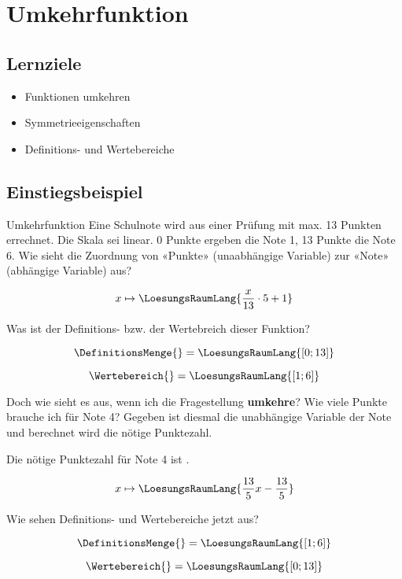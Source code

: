\section{Umkehrfunktion}

\subsection{Lernziele}

\begin{itemize}
\item Funktionen umkehren
\item Symmetrieeigenschaften
\item Definitions- und Wertebereiche
\end{itemize} 
\newpage

\subsection{Einstiegsbeispiel}
\begin{beispiel}{Umkehrfunktion}{}
  Eine Schulnote wird aus einer Prüfung mit max. 13 Punkten errechnet.
  Die Skala sei linear. 0 Punkte ergeben die Note 1, 13 Punkte die
  Note 6. Wie sieht die Zuordnung von «Punkte» (unaabhängige Variable)
  zur «Note» (abhängige Variable) aus?

  \leserluft
  
  $$x \mapsto  \LoesungsRaumLang{\frac{x}{13}\cdot{} 5 + 1}$$

  Was ist der Definitions- bzw. der Wertebreich dieser Funktion?

  \leserluft
  
  $$\DefinitionsMenge{} = \LoesungsRaumLang{[0; 13]}$$

  \leserluft
  
  $$\Wertebereich{} = \LoesungsRaumLang{[1; 6]}$$

  Doch wie sieht es aus, wenn ich die Fragestellung \textbf{umkehre}?
  Wie viele Punkte brauche ich für Note 4? Gegeben ist diesmal die
  unabhängige Variable der Note und berechnet wird die nötige
  Punktezahl.

  \leserluft{}
  
  Die nötige Punktezahl für Note 4 ist .

  \leserluft{}
  
  $$x \mapsto \LoesungsRaumLang{\frac{13}5 x - \frac{13}5}$$

    Wie sehen Definitions- und Wertebereiche jetzt aus?

    $$\DefinitionsMenge{} = \LoesungsRaumLang{ [1; 6] }$$


    $$\Wertebereich{} = \LoesungsRaumLang{ [0;13] }$$
  
\end{beispiel}
\newpage

